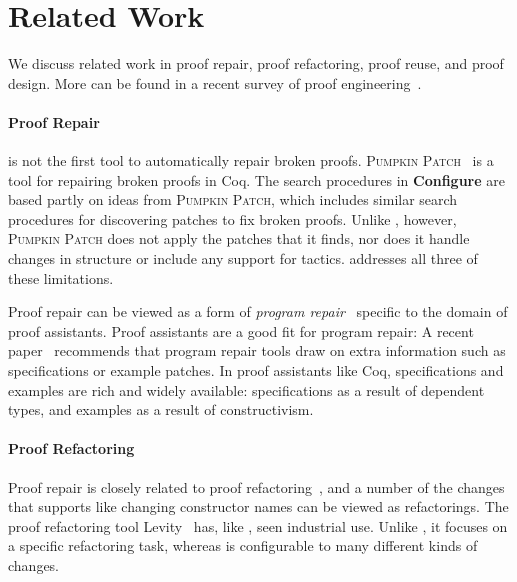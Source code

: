 \section{Related Work}


We discuss related work in proof repair, proof refactoring, proof reuse, and proof design.
More can be found in a recent survey of proof engineering~\cite{PGL-045}.

\paragraph{Proof Repair}

\toolname is not the first tool to automatically repair broken proofs.
\textsc{Pumpkin Patch}~\cite{pumpkinpatch} is a tool for repairing broken proofs in Coq.
The search procedures in \textbf{Configure} are based partly on ideas from \textsc{Pumpkin Patch}, which includes
similar search procedures for discovering patches to fix broken proofs.
Unlike \toolname, however, \textsc{Pumpkin Patch} does not apply the patches that it finds,
nor does it handle changes in structure or include any support for tactics.
\toolname addresses all three of these limitations.

Proof repair can be viewed as a form of \textit{program repair}~\cite{Monperrus:2018:ASR:3177787.3105906, Gazzola:2018:ASR:3180155.3182526}
specific to the domain of proof assistants.
Proof assistants are a good fit for program repair: A recent paper~\cite{Qi:2015:APP:2771783.2771791} 
recommends that program repair tools draw on extra information
such as specifications or example patches. In proof assistants like Coq, specifications and examples 
are rich and widely available: specifications as a result of dependent types,
and examples as a result of constructivism.

\paragraph{Proof Refactoring}

Proof repair is closely related to proof refactoring~\cite{WhitesidePhD}, and a number of the changes
that \toolname supports like changing constructor names can be viewed as refactorings.
The proof refactoring tool Levity~\cite{Bourke12} has, like \toolname, seen industrial use.
Unlike \toolname, it focuses on a specific refactoring task, whereas \toolname is configurable to many different kinds of changes.

